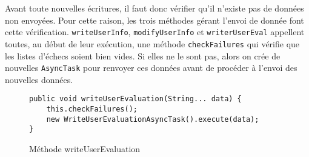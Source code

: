 \documentclass[../main.tex]{subfiles}
\begin{document}
Avant toute nouvelles écritures, il faut donc vérifier qu'il n'existe pas de données non envoyées. Pour cette raison, les trois méthodes gérant l'envoi de donnée font cette vérification. \texttt{writeUserInfo}, \texttt{modifyUserInfo} et \texttt{writerUserEval} appellent toutes, au début de leur exécution, une méthode \texttt{checkFailures} qui vérifie que les listes d'échecs soient bien vides. Si elles ne le sont pas, alors on crée de nouvelles \texttt{AsyncTask} pour renvoyer ces données avant de procéder à l'envoi des nouvelles données.

\begin{figure}[ht!]
\begin{lstlisting}[tabsize=3]
public void writeUserEvaluation(String... data) {
	this.checkFailures();
	new WriteUserEvaluationAsyncTask().execute(data);
}
\end{lstlisting}
\caption{Méthode writeUserEvaluation}
\label{fig-writeeval}
\end{figure}	
\end{document}
